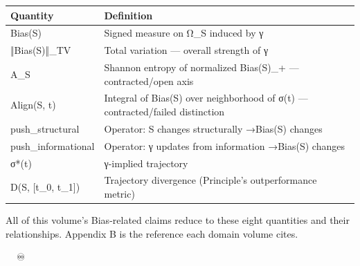 \documentclass[11pt, openany]{book}
\newcommand{\sectionbreak}{\clearpage}
\begin{document}
\begingroup\setlength{\tabcolsep}{3pt}\renewcommand{\arraystretch}{1.15}\footnotesize
\begin{center}
\begin{tabular}{p{0.83in} p{3.56in}}
\toprule
Quantity & Definition \\
\midrule
Bias(S) & Signed measure on Ω\_\allowbreak{}S induced by γ \\
‖Bias(S)‖\_\allowbreak{}TV & Total variation --- overall strength of γ \\
A\_\allowbreak{}S & Shannon entropy of normalized Bias(S)\_\allowbreak{}+ --- contracted/\allowbreak open axis \\
Align(S, t) & Integral of Bias(S) over neighborhood of σ(t) --- contracted/\allowbreak failed distinction \\
push\_\allowbreak{}structural & Operator: S changes structurally →\allowbreak  Bias(S) changes \\
push\_\allowbreak{}informational & Operator: γ updates from information →\allowbreak  Bias(S) changes \\
σ*(t) & γ-implied trajectory \\
D(S, [t\_\allowbreak{}0, t\_\allowbreak{}1]) & Trajectory divergence (Principle's outperformance metric) \\
\bottomrule
\end{tabular}
\end{center}
\endgroup
All of this volume's Bias-related claims reduce to these eight quantities and their relationships. Appendix B is the reference each domain volume cites.

\sectionbreak

🦞🧍💜🔥♾️
\end{document}
